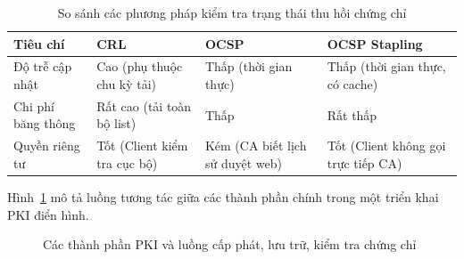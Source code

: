 \begin{table}[h]
    \centering
    \caption{So sánh các phương pháp kiểm tra trạng thái thu hồi chứng chỉ}
    \label{tab:revocation}
    \begin{tabular}{|p{3cm}|p{4cm}|p{4cm}|p{4cm}|}
        \hline
        \textbf{Tiêu chí} & \textbf{CRL} & \textbf{OCSP} & \textbf{OCSP Stapling} \\
        \hline
        Độ trễ cập nhật & Cao (phụ thuộc chu kỳ tải) & Thấp (thời gian thực) & Thấp (thời gian thực, có cache) \\
        \hline
        Chi phí băng thông & Rất cao (tải toàn bộ list) & Thấp & Rất thấp \\
        \hline
        Quyền riêng tư & Tốt (Client kiểm tra cục bộ) & Kém (CA biết lịch sử duyệt web) & Tốt (Client không gọi trực tiếp CA) \\
        \hline
    \end{tabular}
\end{table}

Hình~\ref{fig:pki-components} mô tả luồng tương tác giữa các thành phần chính trong một triển khai PKI điển hình.

\begin{figure}[htbp]
    \centering
    \caption{Các thành phần PKI và luồng cấp phát, lưu trữ, kiểm tra chứng chỉ}
    \label{fig:pki-components}
\end{figure}


